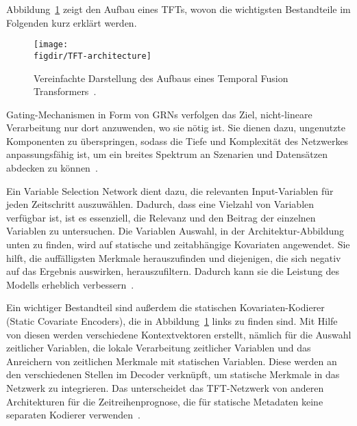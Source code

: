 Abbildung~\ref{FIG:tft-architecture} zeigt den Aufbau eines \ac{TFT}s, wovon die wichtigsten Bestandteile im Folgenden kurz erklärt werden.
\begin{figure}
 \caption{Vereinfachte Darstellung des Aufbaus eines Temporal Fusion Transformers~\cite{Labiadh.2023}.}
 {\texttt{[image: \\figdir/TFT-architecture]}}
 \label{FIG:tft-architecture}
\end{figure}

Gating-Mechanismen in Form von \ac{GRN}s verfolgen das Ziel, nicht-lineare Verarbeitung nur dort anzuwenden, wo sie nötig ist.
Sie dienen dazu, ungenutzte Komponenten zu überspringen, sodass die Tiefe und Komplexität des Netzwerkes anpassungsfähig ist, um ein breites Spektrum an Szenarien und Datensätzen abdecken zu können~\cite{Lim.19.12.2019}.

Ein Variable Selection Network dient dazu, die relevanten Input-Variablen für jeden Zeitschritt auszuwählen.
Dadurch, dass eine Vielzahl von Variablen verfügbar ist, ist es essenziell, die Relevanz und den Beitrag der einzelnen Variablen zu untersuchen.
Die Variablen Auswahl, in der Architektur-Abbildung unten zu finden, wird auf statische und zeitabhängige Kovariaten angewendet.
Sie hilft, die auffälligsten Merkmale herauszufinden und diejenigen, die sich negativ auf das Ergebnis auswirken, herauszufiltern.
Dadurch kann sie die Leistung des Modells erheblich verbessern~\cite{Lim.19.12.2019}.

Ein wichtiger Bestandteil sind außerdem die statischen Kovariaten-Kodierer (Static Covariate Encoders), die in Abbildung~\ref{FIG:tft-architecture} links zu finden sind.
Mit Hilfe von diesen werden verschiedene Kontextvektoren erstellt, nämlich für die Auswahl zeitlicher Variablen, die lokale Verarbeitung zeitlicher Variablen und das Anreichern von zeitlichen Merkmale mit statischen Variablen.
Diese werden an den verschiedenen Stellen im Decoder verknüpft, um statische Merkmale in das Netzwerk zu integrieren.
Das unterscheidet das \ac{TFT}-Netzwerk von anderen Architekturen für die Zeitreihenprognose, die für statische Metadaten keine separaten Kodierer verwenden~\cite{Lim.19.12.2019, Labiadh.2023}.

